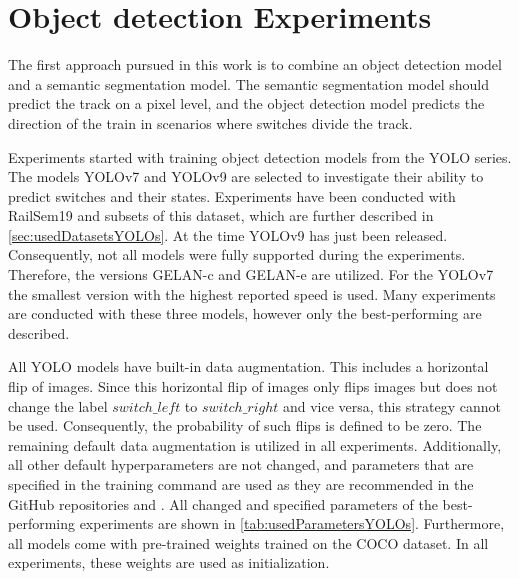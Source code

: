 \section{Object detection Experiments}

The first approach pursued in this work is to combine an object detection model and a semantic segmentation model.
The semantic segmentation model should predict the track on a pixel level, and the object detection model predicts the direction of the train in scenarios where switches divide the track.

Experiments started with training object detection models from the \ac{YOLO} series.
The models \ac{YOLO}v7 \cite{yolov7} and \ac{YOLO}v9 \cite{YOLOv9} are selected to investigate their ability to predict switches and their states.
Experiments have been conducted with RailSem19 and subsets of this dataset, which are further described in \autoref{sec:usedDatasetsYOLOs}.
At the time \ac{YOLO}v9 has just been released.
Consequently, not all models were fully supported during the experiments.
Therefore, the versions \ac{GELAN}-c and \ac{GELAN}-e are utilized.
For the \ac{YOLO}v7 the smallest version with the highest reported speed is used.
Many experiments are conducted with these three models, however only the best-performing are described.

All \ac{YOLO} models have built-in data augmentation.
This includes a horizontal flip of images.
Since this horizontal flip of images only flips images but does not change the label $switch\_left$ to $switch\_right$ and vice versa, this strategy cannot be used.
Consequently, the probability of such flips is defined to be zero. The remaining default data augmentation is utilized in all experiments.
Additionally, all other default hyperparameters are not changed, and parameters that are specified in the training command are used as they are recommended in the GitHub repositories \cite{YOLOv7GitHub} and \cite{YOLOv9GitHub}.
All changed and specified parameters of the best-performing experiments are shown in \autoref{tab:usedParametersYOLOs}.
Furthermore, all models come with pre-trained weights trained on the COCO dataset.
In all experiments, these weights are used as initialization.


